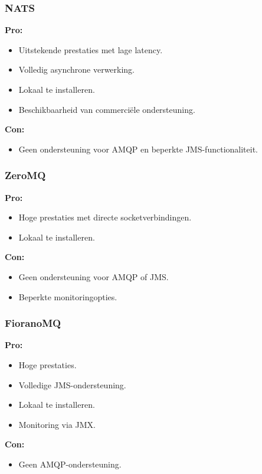 \subsubsection{NATS}
\textbf{Pro:}
\begin{itemize}
    \item Uitstekende prestaties met lage latency.
    \item Volledig asynchrone verwerking.
    \item Lokaal te installeren.
    \item Beschikbaarheid van commerciële ondersteuning.
\end{itemize}
\textbf{Con:}
\begin{itemize}
    \item Geen ondersteuning voor AMQP en beperkte JMS-functionaliteit.
\end{itemize}

\subsubsection{ZeroMQ}
\textbf{Pro:}
\begin{itemize}
    \item Hoge prestaties met directe socketverbindingen.
    \item Lokaal te installeren.
\end{itemize}
\textbf{Con:}
\begin{itemize}
    \item Geen ondersteuning voor AMQP of JMS.
    \item Beperkte monitoringopties.
\end{itemize}

\subsubsection{FioranoMQ}
\textbf{Pro:}
\begin{itemize}
    \item Hoge prestaties.
    \item Volledige JMS-ondersteuning.
    \item Lokaal te installeren.
    \item Monitoring via JMX.
\end{itemize}
\textbf{Con:}
\begin{itemize}
    \item Geen AMQP-ondersteuning.
\end{itemize}

